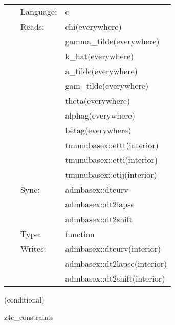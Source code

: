  \begin{tabular*}{160mm}{cll} 
~ & Language:  & c \\ 
~ & Reads:  & chi(everywhere) \\ 
~& ~ &gamma\_tilde(everywhere)\\ 
~& ~ &k\_hat(everywhere)\\ 
~& ~ &a\_tilde(everywhere)\\ 
~& ~ &gam\_tilde(everywhere)\\ 
~& ~ &theta(everywhere)\\ 
~& ~ &alphag(everywhere)\\ 
~& ~ &betag(everywhere)\\ 
~& ~ &tmunubasex::ettt(interior)\\ 
~& ~ &tmunubasex::etti(interior)\\ 
~& ~ &tmunubasex::etij(interior)\\ 
~ & Sync:  & admbasex::dtcurv \\ 
~& ~ &admbasex::dt2lapse\\ 
~& ~ &admbasex::dt2shift\\ 
~ & Type:  & function \\ 
~ & Writes:  & admbasex::dtcurv(interior) \\ 
~& ~ &admbasex::dt2lapse(interior)\\ 
~& ~ &admbasex::dt2shift(interior)\\ 
\end{tabular*} 


\vspace{5mm}

   (conditional) 

\hspace{5mm} z4c\_constraints 

\hspace{5mm}{\it calculate z4c constraints } 


\hspace{5mm}


